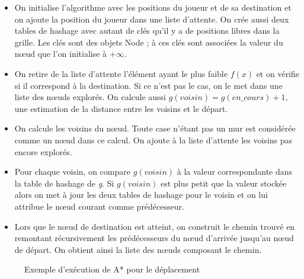 \documentclass[a4paper,12pt]{article} %
\begin{document}
\begin{itemize}
\item On initialise l'algorithme avec les positions du joueur et de sa destination et on ajoute la position du joueur dans une liste d'attente. On crée aussi deux tables de hashage avec autant de clés qu'il y a de positions libres dans la grille. Les clés sont des objets Node ; à ces clés sont associées la valeur du nœud que l'on initialise à +$\infty$.
\item On retire de la liste d'attente l'élément ayant le plus faible $f(x)$ et on vérifie si il correspond à la destination. Si ce n'est pas le cas, on le met dans une liste des nœuds explorés. On calcule aussi $g(voisin)=g(en\_cours)+1$, une estimation de la distance entre les voisins et le départ.
\item On calcule les voisins du nœud. Toute case n'étant pas un mur est considérée comme un nœud dans ce calcul. On ajoute à la liste d'attente les voisins pas encore explorés.
\item Pour chaque voisin, on compare $g(voisin)$ à la valeur correspondante dans la table de hashage de \textit{g}. Si $g(voisin)$ est plus petit que la valeur stockée alors on met à jour les deux tables de hashage pour le voisin et on lui attribue le nœud courant comme prédécesseur.
\item Lors que le nœud de destination est atteint, on construit le chemin trouvé en remontant récursivement les prédécesseurs du nœud d'arrivée jusqu'au nœud de départ. On obtient ainsi la liste des nœuds composant le chemin.
\end{itemize}

\begin{figure}[!h]
\centering
{}
\caption{Exemple d'exécution de A* pour le déplacement}
\end{figure}
\end{document}

